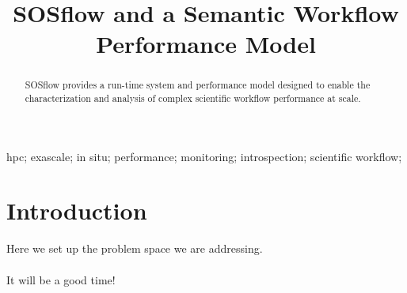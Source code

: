 




\title{SOSflow and a Semantic Workflow Performance Model
 }

\author{
}


\maketitle


\begin{abstract}
SOSflow provides a run-time system and performance model designed to enable the 
characterization and analysis of complex scientific workflow performance at scale.


\end{abstract}

\begin{IEEEkeywords}
hpc; exascale; in situ; performance; monitoring; introspection; scientific 
workflow;

\end{IEEEkeywords}


\IEEEpeerreviewmaketitle


\section{Introduction}
Here we set up the problem space we are addressing.\\
\\
It will be a good time!\\
\\


